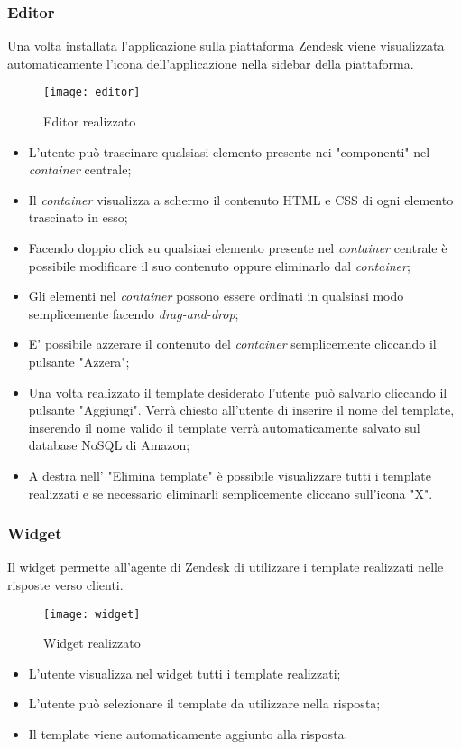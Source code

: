 \subsubsection{Editor}
Una volta installata l'applicazione sulla piattaforma Zendesk viene visualizzata automaticamente l'icona dell'applicazione nella sidebar della piattaforma. 
\begin{figure}[!h] 
	\centering 
	\texttt{[image: editor]} 
	\caption{Editor realizzato }
\end{figure}
\begin{itemize}
	\item L'utente può trascinare qualsiasi elemento presente nei "componenti" nel \emph{container} centrale;
	\item Il \emph{container} visualizza a schermo il contenuto  HTML e CSS di ogni elemento trascinato in esso;
	\item Facendo doppio click su qualsiasi elemento presente nel \emph{container} centrale è possibile modificare il suo contenuto oppure eliminarlo dal \emph{container};
	\item Gli elementi nel \emph{container} possono essere ordinati in qualsiasi modo semplicemente facendo \emph{drag-and-drop};
	\item E' possibile azzerare il contenuto del \emph{container} semplicemente cliccando il pulsante "Azzera";
	\item Una volta realizzato il template desiderato l'utente può salvarlo cliccando il pulsante "Aggiungi". Verrà chiesto all'utente di inserire il nome del template, inserendo il nome valido il template verrà automaticamente salvato sul database NoSQL di Amazon;
	\item A destra nell' "Elimina template" è possibile visualizzare tutti i template realizzati e se necessario eliminarli semplicemente cliccano sull'icona "X".  
\end{itemize}
\subsubsection{Widget} 
Il widget permette all'agente di Zendesk di utilizzare i template realizzati nelle risposte verso clienti. 
\begin{figure}[!h] 
	\centering 
	\texttt{[image: widget]} 
	\caption{Widget realizzato }
\end{figure}
\begin{itemize}
	\item L'utente visualizza nel widget tutti i template realizzati;
	\item L'utente può selezionare il template da utilizzare nella risposta;
	\item Il template viene automaticamente aggiunto alla risposta. 
\end{itemize}
\newpage
